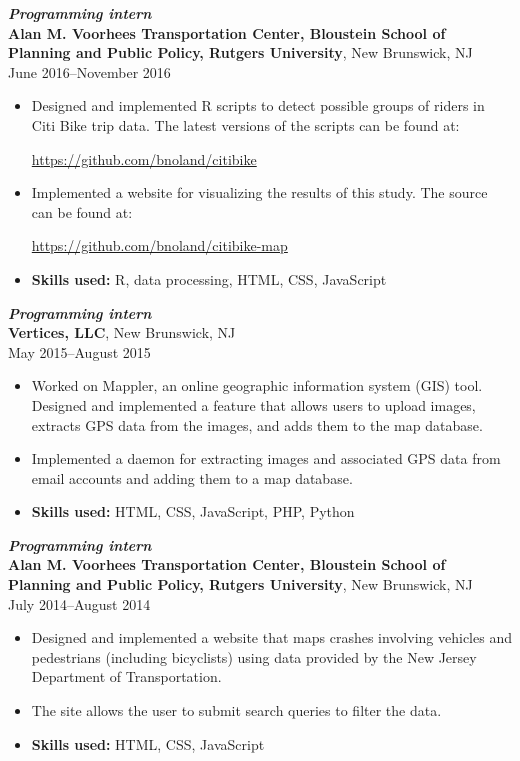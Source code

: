 \documentclass[letterpaper,12pt]{article}
\begin{document}
\textit{\textbf{Programming intern}} \\
\textbf{Alan M. Voorhees Transportation Center, Bloustein School of
  Planning and Public Policy, Rutgers University},
New Brunswick, NJ \\
June 2016--November 2016
\begin{itemize}
\item Designed and implemented R scripts to detect possible groups of
  riders in Citi Bike trip data. The latest versions of the scripts
  can be found at:
  \begin{center}
    \url{https://github.com/bnoland/citibike}
  \end{center}

\item Implemented a website for visualizing the results of this
  study. The source can be found at:
  \begin{center}
    \url{https://github.com/bnoland/citibike-map}
  \end{center}

\item \textbf{Skills used:} R, data processing, HTML, CSS, JavaScript
\end{itemize}

\textit{\textbf{Programming intern}} \\
\textbf{Vertices, LLC}, New Brunswick, NJ \\
May 2015--August 2015
\begin{itemize}
\item Worked on Mappler, an online geographic information system (GIS)
  tool. Designed and implemented a feature that allows users to upload
  images, extracts GPS data from the images, and adds them to the map
  database.
\item Implemented a daemon for extracting images and associated GPS
  data from email accounts and adding them to a map database.
\item \textbf{Skills used:} HTML, CSS, JavaScript, PHP, Python
\end{itemize}

\textit{\textbf{Programming intern}} \\
\textbf{Alan M. Voorhees Transportation Center, Bloustein School of
  Planning and Public Policy, Rutgers University},
New Brunswick, NJ \\
July 2014--August 2014
\begin{itemize}
\item Designed and implemented a website that maps crashes involving
  vehicles and pedestrians (including bicyclists) using data provided
  by the New Jersey Department of Transportation.
\item The site allows the user to submit search queries to filter the
  data.
\item \textbf{Skills used:} HTML, CSS, JavaScript
\end{itemize}
\end{document}
